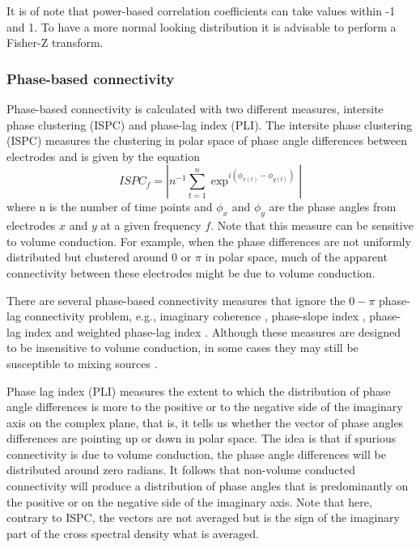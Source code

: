 \documentclass[11pt, onecolumn]{article}
\begin{document}
It is of note that power-based correlation coefficients can take values within -1 and 1. To have a more normal looking distribution it is advisable to perform a Fisher-Z transform.

\subsubsection{Phase-based connectivity}
Phase-based connectivity is calculated with two different measures, intersite phase clustering (ISPC) and phase-lag index (PLI). 
The intersite phase clustering (ISPC) measures the clustering in polar space of phase angle differences between electrodes and is given by the equation 
\begin{equation}
ISPC_f = | n^{-1} \sum_{t=1}^{n} \exp ^{i(\phi_{x(t)} -\phi_{y(t)})}|
\label{eq:ispc}
\end{equation}
where n is the number of time points and $\phi_x$ and $\phi_y$ are the phase angles from electrodes $x$ and $y$ at a given frequency $f$. Note that this measure can be sensitive to volume conduction. For example, when the phase differences are not uniformly distributed but clustered around 0 or $\pi$ in polar space, much of the apparent connectivity between these electrodes might be due to volume conduction.

There are several phase-based connectivity measures that ignore the $0-\pi$ phase-lag connectivity problem, e.g., imaginary coherence \citep{nolte2004identifying}, phase-slope index \citep{nolte2008robustly}, phase-lag index \citep{stam2007phase} and weighted phase-lag index \cite{vinck2011improved}. Although these measures are designed to be insensitive to volume conduction, in
some cases they may still be susceptible to mixing sources \citep{peraza2012volume}.

Phase lag index (PLI) measures the extent to which the distribution of phase angle differences is more to the positive or to the negative side of the imaginary axis on the complex plane, that is, it tells us whether the vector of phase angles differences are pointing up or down in polar space. The idea is that if spurious connectivity is due to volume conduction, the phase angle differences will be distributed around zero radians. It follows that non-volume conducted connectivity will produce a distribution of phase angles that is predominantly on the positive or on the negative side of the imaginary axis. Note that here, contrary to ISPC, the vectors are not averaged but is the sign of the imaginary part of the cross spectral density what is averaged.
\end{document}
